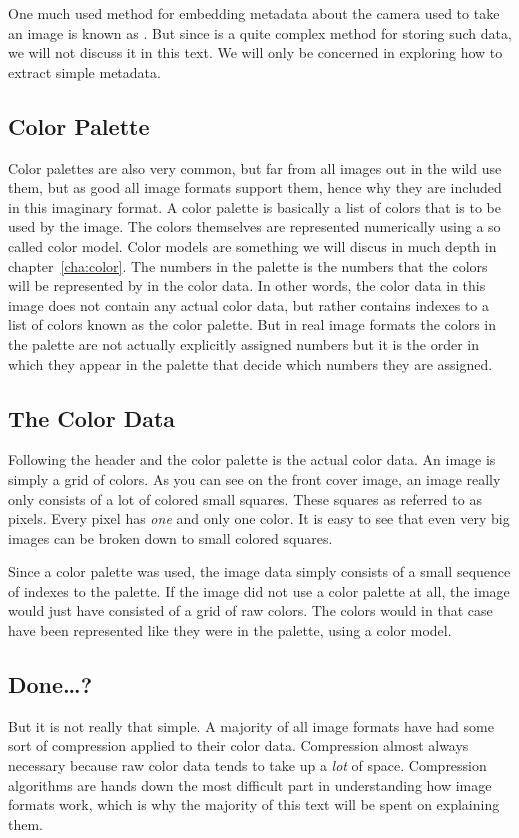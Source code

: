 One much used method for embedding metadata about the camera used to
take an image is known as
\exif\cite{camera:_cipa_dc_trans_exchan}. But since \exif is a quite
complex method for storing such data, we will not discuss it in this
text. We will only be concerned in exploring how to extract simple
metadata.

\subsection{Color Palette}

Color palettes are also very common, but far from all images out in
the wild use them, but as good all image formats support them, hence
why they are included in this imaginary format. A color palette is
basically a list of colors that is to be used by the image. The colors
themselves are represented numerically using a so called color
model. Color models are something we will discus in much depth in
chapter~\ref{cha:color}. The numbers in the palette is the numbers
that the colors will be represented by in the color data. In other
words, the color data in this image does not contain any actual color
data, but rather contains indexes to a list of colors known as the
color palette. But in real image formats the colors in the palette are
not actually explicitly assigned numbers but it is the order in which
they appear in the palette that decide which numbers they are
assigned.

\subsection{The Color Data}

Following the header and the color palette is the actual color data.
An image is simply a grid of colors. As you can see on the front cover
image, an image really only consists of a lot of colored small
squares. These squares as referred to as
pixels\cite{murray1996encyclopedia}. Every pixel has \textit{one} and
only one color. It is easy to see that even very big images can be
broken down to small colored squares.

Since a color palette was used, the image data simply consists of a
small sequence of indexes to the palette. If the image did not use a
color palette at all, the image would just have consisted of a grid of
raw colors. The colors would in that case have been represented like
they were in the palette, using a color model.

\subsection{Done\dots?}

But it is not really that simple. A majority of all image formats have
had some sort of compression applied to their color data. Compression
almost always necessary because raw color data tends to take up a
\textit{lot} of space. Compression algorithms are hands down the most
difficult part in understanding how image formats work, which is why
the majority of this text will be spent on explaining them.

